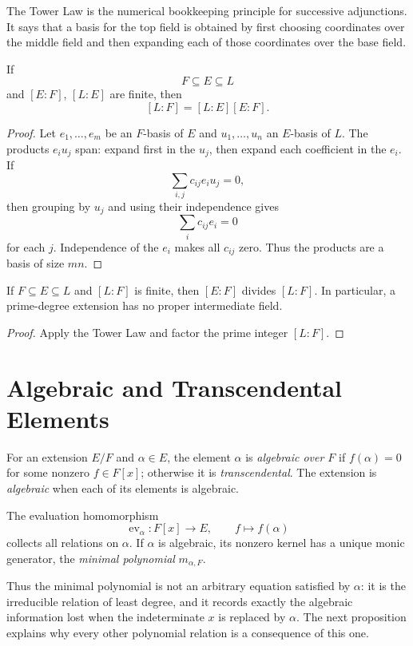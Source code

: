 The Tower Law is the numerical bookkeeping principle for successive
adjunctions.  It says that a basis for the top field is obtained by first
choosing coordinates over the middle field and then expanding each of those
coordinates over the base field.

\begin{theorem}\label{thm:tower-law}
If
\[
F\subseteq E\subseteq L
\]
and \([E:F]\), \([L:E]\) are finite, then
\[
[L:F]=[L:E][E:F].
\]
\end{theorem}
\begin{proof}
Let \(e_1,\ldots,e_m\) be an \(F\)-basis of \(E\) and
\(u_1,\ldots,u_n\) an \(E\)-basis of \(L\).  The products \(e_i u_j\) span:
expand first in the \(u_j\), then expand each coefficient in the \(e_i\).
If
\[
\sum_{i,j}c_{ij}e_i u_j=0,
\]
then grouping by \(u_j\) and using their independence gives
\[
\sum_i c_{ij}e_i=0
\]
for each \(j\).  Independence of the \(e_i\) makes all \(c_{ij}\) zero.
Thus the products are a basis of size \(mn\).
\end{proof}

\begin{corollary}
If \(F\subseteq E\subseteq L\) and \([L:F]\) is finite, then
\([E:F]\) divides \([L:F]\).  In particular, a prime-degree extension has
no proper intermediate field.
\end{corollary}
\begin{proof}
Apply the Tower Law and factor the prime integer \([L:F]\).
\end{proof}

\section{Algebraic and Transcendental Elements}
\label{sec:algebraic-transcendental}
\begin{definition}
For an extension \(E/F\) and \(\alpha\in E\), the element \(\alpha\) is
\emph{algebraic over \(F\)} if \(f(\alpha)=0\) for some nonzero
\(f\in F[x]\); otherwise it is \emph{transcendental}.  The extension is
\emph{algebraic} when each of its elements is algebraic.
\end{definition}

The evaluation homomorphism
\[
\operatorname{ev}_\alpha:F[x]\longrightarrow E,
\qquad
f\longmapsto f(\alpha)
\]
collects all relations on \(\alpha\).  If \(\alpha\) is algebraic, its
nonzero kernel has a unique monic generator, the \emph{minimal polynomial}
\(m_{\alpha,F}\).

Thus the minimal polynomial is not an arbitrary equation satisfied by
\(\alpha\): it is the irreducible relation of least degree, and it records
exactly the algebraic information lost when the indeterminate \(x\) is
replaced by \(\alpha\).  The next proposition explains why every other
polynomial relation is a consequence of this one.

